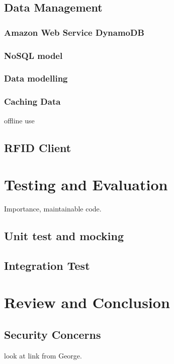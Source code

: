 \documentclass[a4paper, 11pt]{article}
\begin{document}

\subsection{Data Management}
\subsubsection{Amazon Web Service DynamoDB}

\subsubsection{NoSQL model}
\subsubsection{Data modelling} 
\subsubsection{Caching Data} offline use 

\subsection{RFID Client}%

\section{Testing and Evaluation}
Importance, maintainable code.
\subsection{Unit test and mocking}
\subsection{Integration Test}

\section{Review and Conclusion}
\subsection{Security Concerns} look at link from George. 



\vspace{\baselineskip}
\vspace{\baselineskip}
\vspace{\baselineskip}
\end{document}
